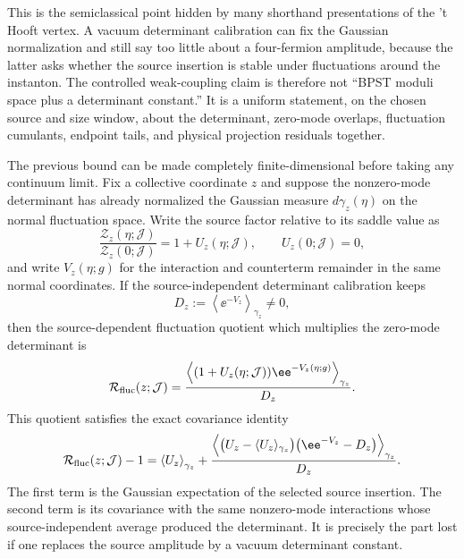 \begin{controlledapproximation}
This is the semiclassical point hidden by many shorthand presentations of the
't Hooft vertex.  A vacuum determinant calibration can fix the Gaussian
normalization and still say too little about a four-fermion amplitude, because
the latter asks whether the source insertion is stable under fluctuations
around the instanton.  The controlled weak-coupling claim is therefore not
``BPST moduli space plus a determinant constant.''  It is a uniform statement,
on the chosen source and size window, about the determinant, zero-mode
overlaps, fluctuation cumulants, endpoint tails, and physical projection
residuals together.
\end{controlledapproximation}

\begin{controlledapproximation}
\label{ca:instanton-finite-gaussian-source-insertion}
The previous bound can be made completely finite-dimensional before taking
any continuum limit.  Fix a collective coordinate \(z\) and suppose the
nonzero-mode determinant has already normalized the Gaussian measure
\(d\gamma_z(\eta)\) on the normal fluctuation space.  Write the source factor
relative to its saddle value as
\[
  \frac{\mathcal Z_z(\eta;\mathcal J)}
       {\mathcal Z_z(0;\mathcal J)}
  =
  1+U_z(\eta;\mathcal J),
  \qquad
  U_z(0;\mathcal J)=0,
\]
and write \(V_z(\eta;g)\) for the interaction and counterterm remainder in
the same normal coordinates.  If the source-independent determinant
calibration keeps
\[
  D_z:=\left\langle \ee^{-V_z}\right\rangle_{\gamma_z}\ne0,
\]
then the source-dependent fluctuation quotient which multiplies the
zero-mode determinant is
\begin{equation}
  \mathcal R_{\rm fluc}(z;\mathcal J)
  =
  \frac{
    \left\langle
      (1+U_z(\eta;\mathcal J))\ee^{-V_z(\eta;g)}
    \right\rangle_{\gamma_z}
  }{
    D_z
  } .
  \label{eq:instanton-finite-source-fluctuation-quotient}
\end{equation}
This quotient satisfies the exact covariance identity
\begin{equation}
  \mathcal R_{\rm fluc}(z;\mathcal J)-1
  =
  \left\langle U_z\right\rangle_{\gamma_z}
  +
  \frac{
    \left\langle
      \bigl(U_z-\langle U_z\rangle_{\gamma_z}\bigr)
      \bigl(\ee^{-V_z}-D_z\bigr)
    \right\rangle_{\gamma_z}
  }{
    D_z
  } .
  \label{eq:instanton-source-determinant-covariance-identity}
\end{equation}
The first term is the Gaussian expectation of the selected source insertion.
The second term is its covariance with the same nonzero-mode interactions
whose source-independent average produced the determinant.  It is precisely
the part lost if one replaces the source amplitude by a vacuum determinant
constant.


\end{controlledapproximation}
